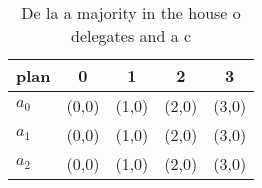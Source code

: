 \documentclass[a4paper]{article}
\begin{document}
\begin{table}
\begin{adjustbox}{width=0.6\columnwidth}
\begin{tabular}{|l|l|l|l|l|}
\hline
\textbf{plan} & \multicolumn{1}{c|}{\textbf{0}} & \multicolumn{1}{c|}{\textbf{1}} & \multicolumn{1}{c|}{\textbf{2}} & \multicolumn{1}{c|}{\textbf{3}} \\ \hline
\textbf{$a_0$}  & (0,0) & (1,0) & (2,0) & (3,0) \\ \hline
\textbf{$a_1$}  & (0,0) & (1,0) & (2,0) & (3,0) \\ \hline
\textbf{$a_2$}  & (0,0) & (1,0) & (2,0) & (3,0) \\ \hline
\end{tabular}
\end{adjustbox}
\caption{De la a majority in the house o delegates and a c
}
\end{table}
\end{document}
